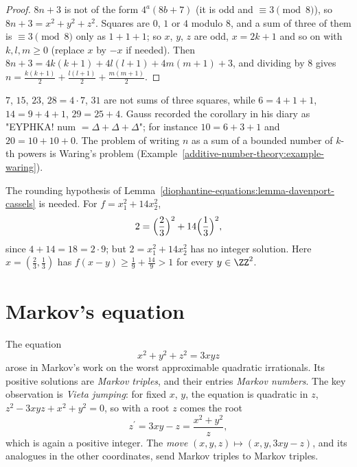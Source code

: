 \begin{proof}
$8n + 3$ is not of the form $4^a(8b + 7)$ (it is odd and $\equiv 3 \pmod 8$), so $8n + 3 = x^2 + y^2 + z^2$. Squares are $0$, $1$ or $4$ modulo $8$, and a sum of three of them is $\equiv 3 \pmod 8$ only as
$1 + 1 + 1$; so $x$, $y$, $z$ are odd, $x = 2k + 1$ and so on with $k, l, m \geq 0$ (replace $x$ by $-x$ if needed). Then $8n + 3 = 4k(k + 1) + 4l(l + 1) + 4m(m + 1) + 3$, and dividing by $8$ gives
$n = \frac{k(k + 1)}{2} + \frac{l(l + 1)}{2} + \frac{m(m + 1)}{2}$.
\end{proof}

\begin{example}\label{diophantine-equations:example-three-squares}
$7$, $15$, $23$, $28 = 4 \cdot 7$, $31$ are not sums of three squares, while $6 = 4 + 1 + 1$, $14 = 9 + 4 + 1$, $29 = 25 + 4$. Gauss recorded the corollary in his diary as "EYPHKA! num $= \Delta + \Delta + \Delta$";
for instance $10 = 6 + 3 + 1$ and $20 = 10 + 10 + 0$. The problem of writing $n$ as a sum of a bounded number of $k$-th powers is Waring's problem
(Example~\ref{additive-number-theory:example-waring}).
\end{example}

\begin{counterexample}\label{diophantine-equations:counterexample-davenport-cassels}
The rounding hypothesis of Lemma~\ref{diophantine-equations:lemma-davenport-cassels} is needed. For $f = x_1^2 + 14x_2^2$,
\[
2 = \Bigl(\frac23\Bigr)^2 + 14\Bigl(\frac13\Bigr)^2,
\]
since $4 + 14 = 18 = 2 \cdot 9$; but $2 = x_1^2 + 14x_2^2$ has no integer solution. Here $x = (\frac23, \frac13)$ has $f(x - y) \geq \frac19 + \frac{14}{9} > 1$ for every $y \in \ZZ^2$.
\end{counterexample}

\section{Markov's equation}\label{diophantine-equations:section-markov}

The equation
\begin{equation}\label{diophantine-equations:equation-markov}
x^2 + y^2 + z^2 = 3xyz
\end{equation}
arose in Markov's work on the worst approximable quadratic irrationals. Its positive solutions are \emph{Markov triples}, and their entries \emph{Markov numbers}. The key observation is \emph{Vieta jumping}:
for fixed $x$, $y$, the equation is quadratic in $z$, $z^2 - 3xyz + x^2 + y^2 = 0$, so with a root $z$ comes the root
\[
z^{\prime} = 3xy - z = \frac{x^2 + y^2}{z},
\]
which is again a positive integer. The \emph{move} $(x, y, z) \mapsto (x, y, 3xy - z)$, and its analogues in the other coordinates, send Markov triples to Markov triples.

